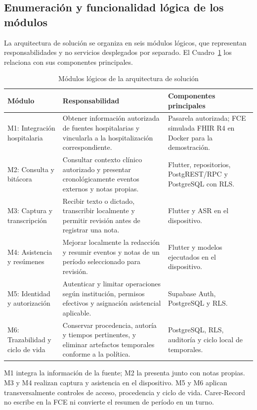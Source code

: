 \subsection{Enumeración y funcionalidad lógica de los módulos}

La arquitectura de solución se organiza en seis módulos lógicos, que representan responsabilidades y no servicios desplegados por separado. El Cuadro~\ref{tab:modulos_arquitectura} los relaciona con sus componentes principales.

\begin{table}[H]
    \caption{Módulos lógicos de la arquitectura de solución}
    \label{tab:modulos_arquitectura}
    \begin{tabularx}{\textwidth}{|l|X|X|}
        \hline
        \textbf{Módulo} & \textbf{Responsabilidad} & \textbf{Componentes principales} \\
        \hline
        M1: Integración hospitalaria & Obtener información autorizada de fuentes hospitalarias y vincularla a la hospitalización correspondiente. & Pasarela autorizada; FCE simulada FHIR R4 en Docker para la demostración. \\
        \hline
        M2: Consulta y bitácora & Consultar contexto clínico autorizado y presentar cronológicamente eventos externos y notas propias. & Flutter, repositorios, PostgREST/RPC y PostgreSQL con RLS. \\
        \hline
        M3: Captura y transcripción & Recibir texto o dictado, transcribir localmente y permitir revisión antes de registrar una nota. & Flutter y ASR en el dispositivo. \\
        \hline
        M4: Asistencia y resúmenes & Mejorar localmente la redacción y resumir eventos y notas de un período seleccionado para revisión. & Flutter y modelos ejecutados en el dispositivo. \\
        \hline
        M5: Identidad y autorización & Autenticar y limitar operaciones según institución, permisos efectivos y asignación asistencial aplicable. & Supabase Auth, PostgreSQL y RLS. \\
        \hline
        M6: Trazabilidad y ciclo de vida & Conservar procedencia, autoría y tiempos pertinentes, y eliminar artefactos temporales conforme a la política. & PostgreSQL, RLS, auditoría y ciclo local de temporales. \\
        \hline
    \end{tabularx}
\end{table}

M1 integra la información de la fuente; M2 la presenta junto con notas propias. M3 y M4 realizan captura y asistencia en el dispositivo. M5 y M6 aplican transversalmente controles de acceso, procedencia y ciclo de vida. Carer-Record no escribe en la FCE ni convierte el resumen de período en un turno.
